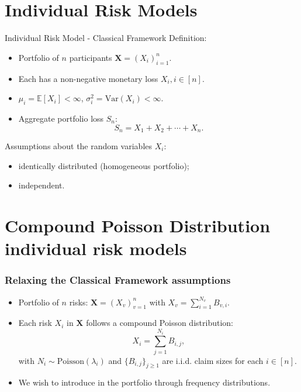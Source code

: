 \documentclass[11pt,xcolor={dvipsnames},hyperref={pdftex,pdfpagemode=UseNone,hidelinks,pdfdisplaydoctitle=true},usepdftitle=false]{beamer}
\begin{document}
\section{Individual Risk Models}
\begin{frame}{Individual Risk Model - Classical Framework}
Definition: 
\begin{itemize}
    \item Portfolio of $n$ participants $\boldsymbol{X} = (X_i)_{i=1}^{n}$.
    \item Each has a non-negative monetary loss $X_i, i \in [n]$.
    \item $\mu_i = \mathbb{E}[X_i] < \infty$, $\sigma_i^2 = \mathrm{Var}(X_i) < \infty$.
    \item Aggregate portfolio loss $S_n$:  
    \begin{equation*}
    S_n = X_1 + X_2 + \cdots + X_n.
    \end{equation*}
\end{itemize}
\vfill

\pause

Assumptions about the random variables $X_i$: 
\begin{itemize}
    \item identically distributed (homogeneous portfolio);
    \item independent. 
\end{itemize}
\end{frame}

\section{Compound Poisson Distribution individual risk models}
\begin{frame}
\frametitle{Relaxing the Classical Framework assumptions}
\begin{itemize}
    \item Portfolio of $n$  risks: $\boldsymbol{X} = (X_v)_{v=1}^{n}$ with $X_v = \sum_{i=1}^{N_v} B_{v,i}$.

    \vfill

    \item Each risk $X_i$ in $\boldsymbol{X}$ follows a compound Poisson distribution: 
        \begin{equation*}
        X_i = \sum_{j=1}^{N_i} B_{i,j},
        \end{equation*}
        with $N_i \sim \text{Poisson}(\lambda_i)$ and $ \{B_{i,j}\}_{j \ge 1}$ are i.i.d. claim sizes for each $i \in [n]$.
    

        \pause

        \vfill

    \item We wish to introduce  in the portfolio through frequency distributions.
\end{itemize}

\end{frame}
\end{document}
